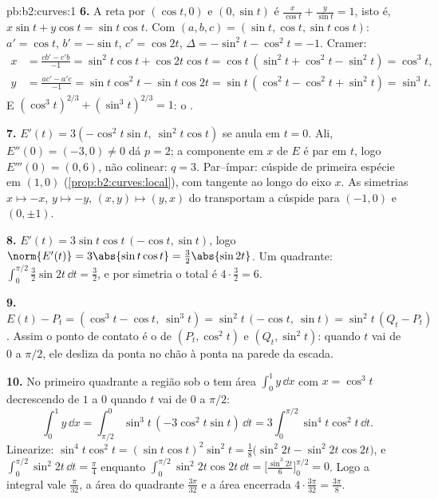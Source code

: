 \begin{solution}{pb:b2:curves:1}
\textbf{6.} A reta por $(\cos t, 0)$ e $(0, \sin t)$
é $\frac x{\cos t} + \frac y{\sin t} = 1$, isto é, $x\sin t +
y\cos t = \sin t\cos t$. Com $(a, b, c) = (\sin t, \cos t,
\sin t\cos t)$: $a' = \cos t$, $b' = -\sin t$, $c' = \cos
2t$, $\Delta = -\sin^2 t - \cos^2 t = -1$. Cramer:
\begin{align*}
x &= \frac{cb' - c'b}{-1} = \sin^2 t\cos t + \cos 2t\cos t
= \cos t\,(\sin^2 t + \cos^2 t - \sin^2 t) = \cos^3 t,\\
y &= \frac{ac' - a'c}{-1} = \sin t\cos^2 t - \sin t\cos 2t
= \sin t\,(\cos^2 t - \cos^2 t + \sin^2 t) = \sin^3 t .
\end{align*}
E $(\cos^3t)^{2/3} + (\sin^3t)^{2/3} = 1$: o .

\textbf{7.} $E'(t) = 3(-\cos^2 t\sin t,\ \sin^2 t\cos t)$
se anula em $t = 0$. Ali, $E''(0) = (-3, 0) \neq 0$ dá
$p = 2$; a componente em $x$ de $E$ é par em $t$, logo
$E'''(0) = (0, 6)$, não colinear: $q = 3$. Par--ímpar: cúspide
de primeira espécie em $(1, 0)$
(\cref{prop:b2:curves:local}), com tangente ao longo do
eixo $x$. As simetrias $x \mapsto -x$, $y \mapsto -y$, $(x,
y) \mapsto (y, x)$ do  transportam a cúspide para $(-1,
0)$ e $(0, \pm1)$.

\textbf{8.} $E'(t) = 3\sin t\cos t\,(-\cos t, \sin t)$, logo
$\norm{E'(t)} = 3\abs{\sin t\cos t} = \tfrac32\abs{\sin 2t}$.
Um quadrante: $\int_0^{\pi/2}\tfrac32\sin 2t\,\dd t =
\tfrac32$, e por simetria o  total é $4 \cdot
\tfrac32 = 6$.

\textbf{9.} $E(t) - P_t = (\cos^3 t - \cos t,\ \sin^3 t) =
\sin^2 t\,(-\cos t,\ \sin t) = \sin^2 t\,(Q_t - P_t)$. Assim o
ponto de contato é o  de $(P_t, \cos^2 t)$ e
$(Q_t, \sin^2 t)$: quando $t$ vai de $0$ a $\pi/2$, ele desliza
da ponta no chão à ponta na parede da escada.

\textbf{10.} No primeiro quadrante a região sob o
 tem área $\int_0^1 y\,\dd x$ com $x = \cos^3 t$
decrescendo de $1$ a $0$ quando $t$ vai de $0$ a $\pi/2$:
\[
\int_0^1 y\,\dd x
= \int_{\pi/2}^{0}\sin^3 t\,(-3\cos^2 t\sin t)\,\dd t
= 3\int_0^{\pi/2}\sin^4 t\cos^2 t\,\dd t .
\]
Linearize: $\sin^4 t\cos^2 t = (\sin t\cos t)^2\sin^2 t =
\tfrac18\bigl(\sin^2 2t - \sin^2 2t\cos 2t\bigr)$, e
$\int_0^{\pi/2}\sin^2 2t\,\dd t = \tfrac\pi4$ enquanto
$\int_0^{\pi/2}\sin^2 2t\cos 2t\,\dd t =
\bigl[\tfrac{\sin^3 2t}6\bigr]_0^{\pi/2} = 0$. Logo a
integral vale $\tfrac\pi{32}$, a área do quadrante
$\tfrac{3\pi}{32}$ e a área encerrada $4 \cdot
\tfrac{3\pi}{32} = \tfrac{3\pi}8$.


\end{solution}
